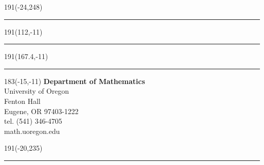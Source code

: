 \documentclass[12pt,a4paper,oneside]{book}
\begin{document}
  \begin{textblock}{191}(-24,248)
  {\color{uogreen}\rule{550pt}{5.5pt}}
  \end{textblock}

  \newpage

  \thispagestyle{empty}
  \sffamily

  \begin{textblock}{191}(112,-11)
    {\color{uogreen}\rule{160pt}{5.5pt}}
  \end{textblock}

  \begin{textblock}{191}(167.4,-11)
    {\color{uogreen}\rule{5.5pt}{59pt}}
  \end{textblock}

  \begin{textblock}{183}(-15,-11)
    \textblockcolour{}
    \flushright
    \fontsize{8}{10}\selectfont
    \textbf{\textcolor{uogreen}{Department of Mathematics}}\\
    University of Oregon\\
    Fenton Hall\\
    Eugene, OR 97403-1222\\
    tel. (541) 346-4705\\
    math.uoregon.edu
  \end{textblock}

  \begin{textblock}{191}(-20,235)
    {\color{uogreen}\rule{544pt}{55pt}}
  \end{textblock}
\end{document}
